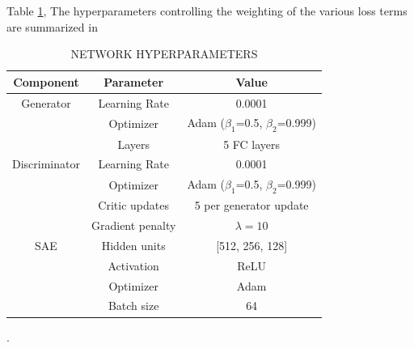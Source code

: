 \documentclass[twocolumn]{IEEEtran}
\begin{document}
Table \ref{tab:hyperparams}, The hyperparameters controlling the weighting of the various loss terms are summarized in \begin{table}[htbp]
\centering
\caption{NETWORK HYPERPARAMETERS}
\label{tab:hyperparams}
\begin{tabular}{ccc}
\hline
Component & Parameter & Value \\
\hline
Generator & Learning Rate & 0.0001 \\
 & Optimizer & Adam ($\beta_1$=0.5, $\beta_2$=0.999) \\
 & Layers & 5 FC layers \\
Discriminator & Learning Rate & 0.0001 \\
 & Optimizer & Adam ($\beta_1$=0.5, $\beta_2$=0.999) \\
 & Critic updates & 5 per generator update \\
 & Gradient penalty & $\lambda=10$ \\
SAE & Hidden units & [512, 256, 128] \\
 & Activation & ReLU \\
 & Optimizer & Adam \\
 & Batch size & 64 \\
\hline
\end{tabular}
\end{table}. 
\end{document}
